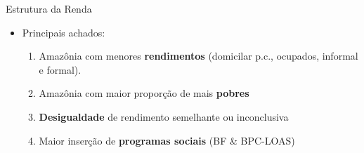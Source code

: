 \documentclass[11pt]{beamer}
\begin{document}
\begin{frame}
\centering
{\huge Estrutura da Renda}

\vspace{4mm}
\begin{itemize}
	\item{Principais achados:
	\vspace{3mm}
	\begin{enumerate}

		\item{Amazônia com menores \textbf{rendimentos} (domicilar p.c., ocupados, informal e formal).}
		\vspace{1mm}
		\item{Amazônia com maior proporção de mais \textbf{pobres}}
		\vspace{1mm}
		\item{\textbf{Desigualdade} de rendimento semelhante ou inconclusiva}
		\vspace{1mm}
		\item{Maior inserção de \textbf{programas sociais} (BF \& BPC-LOAS)}
	\end{enumerate}
	}
\end{itemize}

\end{frame}
\end{document}
